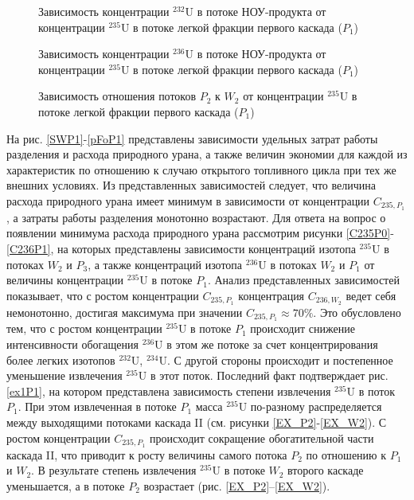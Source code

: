 \begin{figure}[ht]
  \centering
  \begin{minipage}{.5\textwidth}
    \centering
    
    \caption{{Зависимость концентрации $^{232}$U в потоке НОУ-продукта от концентрации $^{235}$U в потоке легкой фракции первого каскада ($P_1$){\label{C232P}}}}
  \end{minipage}%
  \begin{minipage}{.5\textwidth}
    \centering
    
    \caption{{Зависимость концентрации $^{236}$U в потоке НОУ-продукта от концентрации $^{235}$U в потоке легкой фракции первого каскада ($P_1$){\label{C236P}}}}
\end{minipage}
\end{figure}

\begin{figure}[ht]
    \centering
      
    \caption{Зависимость отношения потоков $P_2$ к $W_2$ от концентрации $^{235}$U в потоке легкой фракции первого каскада ($P_1$)}\label{P2W2}
\end{figure}

На рис. \ref{SWP1}-\ref{pFoP1} представлены зависимости удельных затрат работы разделения и расхода природного урана, а также величин экономии для каждой из характеристик по отношению к случаю открытого топливного цикла при тех же внешних условиях. Из представленных зависимостей следует, что величина расхода природного урана имеет минимум в зависимости от концентрации $C_{235,{P_1}}$, а затраты работы разделения монотонно возрастают. Для ответа на вопрос о появлении минимума расхода природного урана рассмотрим рисунки \ref{C235P0}-\ref{C236P1}, на которых представлены зависимости концентраций изотопа $^{235}$U в потоках $W_2$ и $P_3$, а также концентраций изотопа $^{236}$U в потоках $W_2$ и $P_1$ от величины концентрации $^{235}$U в потоке $P_1$. Анализ представленных зависимостей показывает, что с ростом концентрации $C_{235,{P_1}}$ концентрация $C_{236,{W_2}}$ ведет себя немонотонно, достигая максимума при значении $C_{235,{P_1}} \approx 70\%$. Это обусловлено тем, что с ростом концентрации $^{235}$U в потоке $P_1$ происходит снижение интенсивности обогащения $^{236}$U в этом же потоке за счет концентрирования более легких изотопов $^{232}$U, $^{234}$U. С другой стороны происходит и постепенное уменьшение извлечения $^{235}$U в этот поток. Последний факт подтверждает рис. \ref{ex1P1}, на котором представлена зависимость степени извлечения $^{235}$U в поток $P_1$. При этом извлеченная в потоке $P_1$ масса $^{235}$U по-разному распределяется между выходящими потоками каскада II (см. рисунки \ref{EX_P2}-\ref{EX_W2}).
С ростом концентрации $C_{235,{P_1}}$ происходит сокращение обогатительной части каскада II, что приводит к росту величины самого потока $P_2$ по отношению к $P_1$ и $W_2$.
В результате степень извлечения $^{235}$U в потоке $W_2$ второго каскаде уменьшается, а в потоке $P_2$ возрастает (рис. \ref{EX_P2}--\ref{EX_W2}). 

